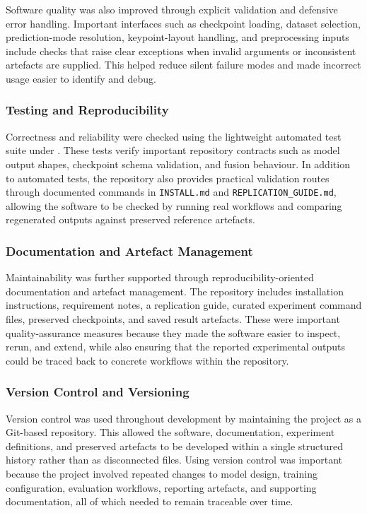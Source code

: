 ﻿\documentclass[11pt,a4paper]{article}
\begin{document}
Software quality was also improved through explicit validation and defensive
error handling. Important interfaces such as checkpoint loading, dataset
selection, prediction-mode resolution, keypoint-layout handling, and
preprocessing inputs include checks that raise clear exceptions when invalid
arguments or inconsistent artefacts are supplied.
This helped reduce silent failure modes and made incorrect usage easier to
identify and debug.

\subsubsection*{Testing and Reproducibility}

Correctness and reliability were checked using the lightweight automated test
suite under . These tests verify important repository contracts
such as model output shapes, checkpoint schema validation, and fusion
behaviour.
In addition to automated tests, the repository also provides practical
validation routes through documented commands in \texttt{INSTALL.md} and
\texttt{REPLICATION\_GUIDE.md}, allowing the software to be checked by running
real workflows and comparing regenerated outputs against preserved reference
artefacts.

\subsubsection*{Documentation and Artefact Management}

Maintainability was further supported through reproducibility-oriented
documentation and artefact management. The repository includes installation
instructions, requirement notes, a replication guide, curated experiment
command files, preserved checkpoints, and saved result artefacts.
These were important quality-assurance measures because they made the software
easier to inspect, rerun, and extend, while also ensuring that the reported
experimental outputs could be traced back to concrete workflows within the
repository.

\subsubsection{Version Control and Versioning}

Version control was used throughout development by maintaining the project as a
Git-based repository. This allowed the software, documentation, experiment
definitions, and preserved artefacts to be developed within a single
structured history rather than as disconnected files.
Using version control was important because the project involved repeated
changes to model design, training configuration, evaluation workflows,
reporting artefacts, and supporting documentation, all of which needed to
remain traceable over time.
\end{document}
